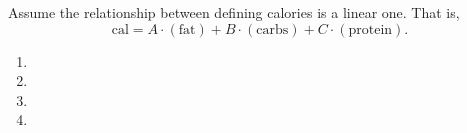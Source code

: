Assume the relationship between defining calories is a linear one. That is,
$$\text{cal} = A \cdot (\text{fat}) + B \cdot (\text{carbs}) + C \cdot (\text{protein}).$$
\begin{enumerate}[label={(\alph*)}]
    \item 
    \item 
    \item \vspace{.2in}
    \item 
\end{enumerate}